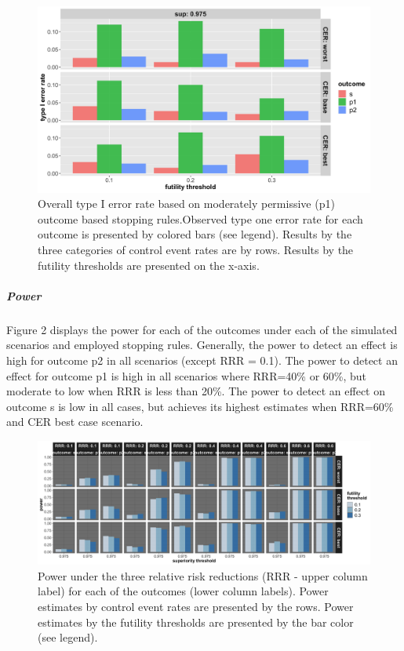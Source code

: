 \documentclass[]{article}
\let\oldsubparagraph\subparagraph
\renewcommand{\subparagraph}[1]{\oldsubparagraph{#1}\mbox{}}
\begin{document}
\begin{figure}
  \caption{Overall type I error rate based on moderately permissive (p1) outcome based stopping rules.Observed type one error rate for each outcome is
  presented by colored bars (see legend). Results by the three categories of control event rates are by rows. Results by the futility thresholds are
  presented on the x-axis.}
  \includegraphics{../p1_plots/batch_size_nb_1000/type_1_error_p1.png}
\end{figure}

\hypertarget{power}{%
\subparagraph{Power}\label{power}}

Figure 2 displays the power for each of the outcomes under each of the
simulated scenarios and employed stopping rules. Generally, the power to
detect an effect is high for outcome p2 in all scenarios (except RRR =
0.1). The power to detect an effect for outcome p1 is high in all
scenarios where RRR=40\% or 60\%, but moderate to low when RRR is less
than 20\%. The power to detect an effect on outcome s is low in all
cases, but achieves its highest estimates when RRR=60\% and CER best
case scenario.

\begin{figure}
  \caption{Power under the three relative risk reductions (RRR - upper column label) for each of the outcomes (lower column labels). 
  Power estimates by control event rates are presented by the rows. Power estimates by the futility thresholds are presented by the bar color (see legend).}
  \includegraphics{../p1_plots/batch_size_nb_1000/power_all_p1.png}
\end{figure}
\end{document}
